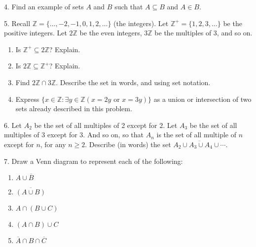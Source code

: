 \documentclass[12pt,]{book}
\theoremstyle{plain}
\theoremstyle{definition}
\theoremstyle{definition}
\theoremstyle{definition}
\numberwithin{equation}{chapter}
\newcommand{\Z}{\mathbb Z}
\newcommand{\st}{:}
\renewcommand{\bar}{\overline}
\begin{document}
\begin{exerciselist}
\par\smallskip
\item[4.]\hypertarget{exercise-76}{}\hypertarget{p-670}{}%
Find an example of sets \(A\) and \(B\) such that \(A \subseteq B\) and \(A \in B\).%
\par\smallskip
\item[5.]\hypertarget{exercise-77}{}\hypertarget{p-672}{}%
Recall \(\Z = \{\ldots,-2,-1,0, 1,2,\ldots\}\) (the integers). Let \(\Z^+ = \{1, 2, 3, \ldots\}\) be the positive integers. Let \(2\Z\) be the even integers, \(3\Z\) be the multiples of 3, and so on.%
\par
\hypertarget{p-673}{}%
\leavevmode%
\begin{enumerate}[label=(\alph*)]
\item\hypertarget{li-317}{}\hypertarget{p-674}{}%
Is \(\Z^+ \subseteq 2\Z\)? Explain.%
\item\hypertarget{li-318}{}\hypertarget{p-675}{}%
Is \(2\Z \subseteq \Z^+\)? Explain.%
\item\hypertarget{li-319}{}\hypertarget{p-676}{}%
Find \(2\Z \cap 3\Z\). Describe the set in words, and using set notation.%
\item\hypertarget{li-320}{}\hypertarget{p-677}{}%
Express \(\{x \in \Z \st \exists y\in \Z (x = 2y \text{ or } x = 3y)\}\) as a union or intersection of two sets already described in this problem.%
\end{enumerate}
%
\par\smallskip
\item[6.]\hypertarget{exercise-78}{}\hypertarget{p-681}{}%
Let \(A_2\) be the set of all multiples of 2 except for \(2\). Let \(A_3\) be the set of all multiples of 3 except for 3. And so on, so that \(A_n\) is the set of all multiple of \(n\) except for \(n\), for any \(n \ge 2\). Describe (in words) the set \(\bar{A_2 \cup A_3 \cup A_4 \cup \cdots}\).%
\par\smallskip
\item[7.]\hypertarget{exercise-79}{}\hypertarget{p-682}{}%
Draw a Venn diagram to represent each of the following: \leavevmode%
\begin{enumerate}[label=(\alph*)]
\item\hypertarget{li-325}{}\(A \cup \bar B\)%
\item\hypertarget{li-326}{}\(\bar{(A \cup B)}\)%
\item\hypertarget{li-327}{}\(A \cap (B \cup C)\)%
\item\hypertarget{li-328}{}\((A \cap B) \cup C\)%
\item\hypertarget{li-329}{}\(\bar A \cap B \cap \bar C\)%

\end{enumerate}
\end{exerciselist}
\end{document}

